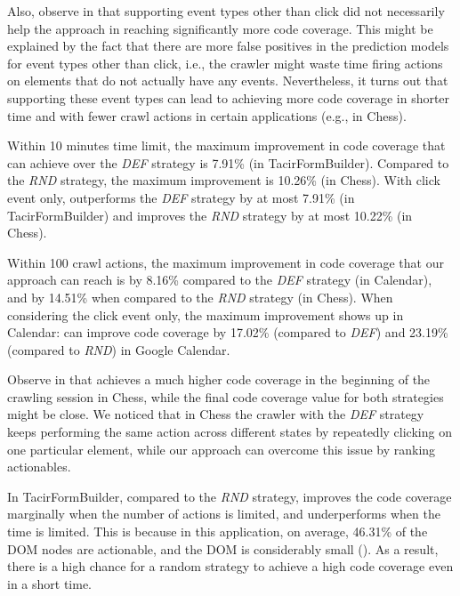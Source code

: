 Also, observe in  that 
supporting event types other than click 
did not necessarily help the approach 
in reaching significantly more \js code coverage.
This might be explained by the fact that there are more false positives 
in the prediction models for event types other than click,
i.e., the crawler might waste time firing actions on elements 
that do not actually have any events.
Nevertheless, it turns out that supporting these event types
can lead to achieving more code coverage
in shorter time and with fewer crawl actions in certain applications
(e.g., in Chess).

Within 10 minutes time limit, the maximum improvement in \js code coverage 
that \toolName can achieve over the \textit{DEF} strategy 
is 7.91\% (in TacirFormBuilder).
Compared to the \textit{RND} strategy,
the maximum improvement is 10.26\% (in Chess).
With click event only, 
\toolName outperforms the \textit{DEF} strategy by at most 7.91\% (in TacirFormBuilder)
and improves the \textit{RND} strategy by at most 10.22\% (in Chess).

Within 100 crawl actions,
the maximum improvement in \js code coverage that our approach 
can reach is by 8.16\%
compared to the \textit{DEF} strategy (in Calendar),
and by 14.51\% when compared to the \textit{RND} strategy (in Chess).
When considering the click event only,
the maximum improvement
shows up in Calendar:
\toolName can improve \js code coverage
by 17.02\% (compared to \textit{DEF}) and 23.19\% (compared to \textit{RND})
in Google Calendar.

Observe in  that
\toolName achieves a much higher code coverage in the beginning of the crawling session
in Chess,
while the final code coverage value for both strategies might be close.
We noticed that in Chess the crawler with the \textit{DEF} strategy
keeps performing the same action across different states
by repeatedly clicking on one particular element,
while our approach can overcome this issue by ranking actionables.

In TacirFormBuilder, compared to the \textit{RND} strategy,
\toolName improves the \js code coverage marginally
when the number of actions is limited,
and underperforms when the time is limited.
This is because in this application,
on average, 46.31\% of the DOM nodes are actionable,
and the DOM is considerably small ().
As a result, there is a high chance for a random strategy 
to achieve a high code coverage even in a short time.


